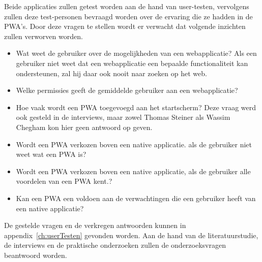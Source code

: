 Beide applicaties zullen getest worden aan de hand van user-testen, vervolgens zullen deze test-personen bevraagd worden over de ervaring die ze hadden in de PWA's.
Door deze vragen te stellen wordt er verwacht dat volgende inzichten zullen verworven worden.
\begin{itemize}
	\item Wat weet de gebruiker over de mogelijkheden van een webapplicatie? Als een gebruiker niet weet dat een webapplicatie een bepaalde functionaliteit kan ondersteunen, zal hij daar ook nooit naar zoeken op het web.
	\item Welke permissies geeft de gemiddelde gebruiker aan een webapplicatie?
	\item Hoe vaak wordt een PWA toegevoegd aan het startscherm? Deze vraag werd ook gesteld in de interviews, maar zowel Thomas Steiner als Wassim Chegham kon hier geen antwoord op geven.
	\item Wordt een PWA verkozen boven een native applicatie. als de gebruiker niet weet wat een PWA is?
	\item Wordt een PWA verkozen boven een native applicatie, als de gebruiker alle voordelen van een PWA kent.?
	\item Kan een PWA een voldoen aan de verwachtingen die een gebruiker heeft van een native applicatie?
\end{itemize}

De gestelde vragen en de verkregen antwoorden kunnen in appendix~\ref{ch:userTesten} gevonden worden.
Aan de hand van de literatuurstudie, de interviews en de praktische onderzoeken zullen de onderzoeksvragen beantwoord worden.

